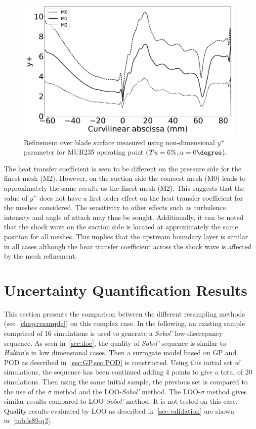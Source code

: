 \begin{figure}[!ht]
\centering
\includegraphics[width=0.8\linewidth,keepaspectratio]{fig/applications/ls89/yplus_M0M1M2_comp.pdf}
\caption{Refinement over blade surface measured using non-dimensional $y^+$ parameter for MUR235 operating point ($Tu=6\%, \alpha = 0\degree$).}
\label{fig:M0M1M2_y+comp}
\end{figure}

The heat transfer coefficient is seen to be different on the pressure side for the finest mesh (M2). However, on the suction side the coarsest mesh (M0) leads to approximately the same results as the finest mesh (M2). This suggests that the value of $y^+$ does not have a first order effect on the heat transfer coefficient for the meshes considered. The sensitivity to other effects such as turbulence intensity and angle of attack may thus be sought. Additionally, it can be noted that the shock wave on the suction side is located at approximately the same position for all meshes. This implies that the upstream boundary layer is similar in all cases although the heat transfer coefficient across the shock wave is affected by the mesh refinement.

\section{Uncertainty Quantification Results}\label{sec:ls89_results}

This section presents the comparison between the different resampling methods (see~\cref{chap:resample}) on this complex case. In the following, an existing sample comprised of 16 simulations is used to generate a \textit{Sobol'} low-discrepancy sequence. As seen in~\cref{sec:doe}, the quality of \textit{Sobol'} sequence is similar to \textit{Halton}'s in low dimensional cases. Then a surrogate model based on GP and POD as described in~\cref{sec:GP,sec:POD} is constructed. Using this initial set of simulations, the sequence has been continued adding 4 points to give a total of 20 simulations. Then using the same initial sample, the previous set is compared to the use of the $\sigma$ method and the LOO-\textit{Sobol'} method. The LOO-$\sigma$ method gives similar results compared to LOO-\textit{Sobol'} method. It is not tested on this case. Quality results evaluated by LOO as described in~\cref{sec:validation} are shown in~\cref{tab:ls89-q2}. 

